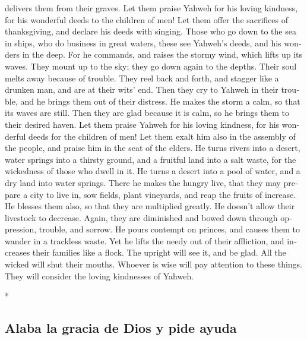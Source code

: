 \begin{paracol}{2}
\begin{otherlanguage}{english}
delivers them from their graves.  Let them praise Yahweh
for his loving kindness, for his wonderful deeds to the children of men!
 Let them offer the sacrifices of thanksgiving, and
declare his deeds with singing.  Those who go down to the
sea in ships, who do business in great waters,  these see
Yahweh's deeds, and his wonders in the deep.  For he
commands, and raises the stormy wind, which lifts up its waves.
 They mount up to the sky; they go down again to the
depths. Their soul melts away because of trouble.  They
reel back and forth, and stagger like a drunken man, and are at their
wits' end.  Then they cry to Yahweh in their trouble, and
he brings them out of their distress.  He makes the storm
a calm, so that its waves are still.  Then they are glad
because it is calm, so he brings them to their desired haven.
 Let them praise Yahweh for his loving kindness, for his
wonderful deeds for the children of men!  Let them exalt
him also in the assembly of the people, and praise him in the seat of
the elders.  He turns rivers into a desert, water springs
into a thirsty ground,  and a fruitful land into a salt
waste, for the wickedness of those who dwell in it.  He
turns a desert into a pool of water, and a dry land into water springs.
 There he makes the hungry live, that they may prepare a
city to live in,  sow fields, plant vineyards, and reap
the fruits of increase.  He blesses them also, so that
they are multiplied greatly. He doesn't allow their livestock to
decrease.  Again, they are diminished and bowed down
through oppression, trouble, and sorrow.  He pours
contempt on princes, and causes them to wander in a trackless waste.
 Yet he lifts the needy out of their affliction, and
increases their families like a flock.  The upright will
see it, and be glad. All the wicked will shut their mouths.
 Whoever is wise will pay attention to these things. They
will consider the loving kindnesses of Yahweh.

\end{otherlanguage}

\switchcolumn[0]*

\hypertarget{alaba-la-gracia-de-dios-y-pide-ayuda}{%
\subsection{Alaba la gracia de Dios y pide
ayuda}\label{alaba-la-gracia-de-dios-y-pide-ayuda}}


\end{paracol}
